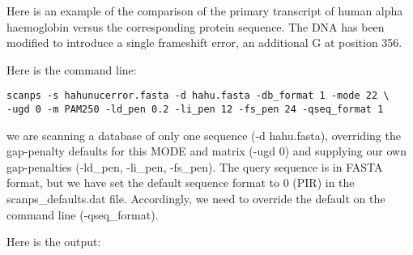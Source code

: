 \documentclass[12pt]{article}
\begin{document}
Here is an example of the comparison of the primary transcript of
human alpha haemoglobin versus the corresponding protein sequence.
The DNA has been modified to introduce a single frameshift error, an
additional G at position 356.

Here is the command line:

\begin{scriptsize}
\begin{verbatim}
scanps -s hahunucerror.fasta -d hahu.fasta -db_format 1 -mode 22 \
-ugd 0 -m PAM250 -ld_pen 0.2 -li_pen 12 -fs_pen 24 -qseq_format 1
\end{verbatim}
\end{scriptsize}

we are scanning a database of only one sequence (-d hahu.fasta),
overriding the gap-penalty defaults for this MODE and matrix (-ugd 0)
and supplying our own gap-penalties (-ld\_pen, -li\_pen, -fs\_pen).  The
query sequence is in FASTA format, but we have set the default
sequence format to 0 (PIR) in the scanps\_defaults.dat file.
Accordingly, we need to override the default on the command line
(-qseq\_format).

Here is the output:
\end{document}
